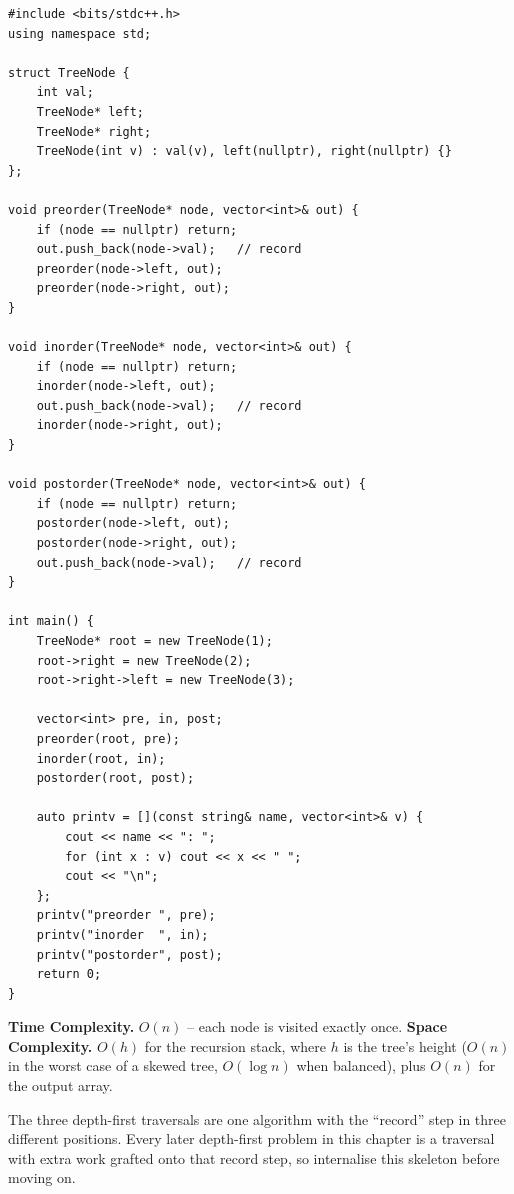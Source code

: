 \begin{lstlisting}
#include <bits/stdc++.h>
using namespace std;

struct TreeNode {
    int val;
    TreeNode* left;
    TreeNode* right;
    TreeNode(int v) : val(v), left(nullptr), right(nullptr) {}
};

void preorder(TreeNode* node, vector<int>& out) {
    if (node == nullptr) return;
    out.push_back(node->val);   // record
    preorder(node->left, out);
    preorder(node->right, out);
}

void inorder(TreeNode* node, vector<int>& out) {
    if (node == nullptr) return;
    inorder(node->left, out);
    out.push_back(node->val);   // record
    inorder(node->right, out);
}

void postorder(TreeNode* node, vector<int>& out) {
    if (node == nullptr) return;
    postorder(node->left, out);
    postorder(node->right, out);
    out.push_back(node->val);   // record
}

int main() {
    TreeNode* root = new TreeNode(1);
    root->right = new TreeNode(2);
    root->right->left = new TreeNode(3);

    vector<int> pre, in, post;
    preorder(root, pre);
    inorder(root, in);
    postorder(root, post);

    auto printv = [](const string& name, vector<int>& v) {
        cout << name << ": ";
        for (int x : v) cout << x << " ";
        cout << "\n";
    };
    printv("preorder ", pre);
    printv("inorder  ", in);
    printv("postorder", post);
    return 0;
}
\end{lstlisting}

\begin{complexitybox}
\textbf{Time Complexity.} $O(n)$ -- each node is visited exactly once.
\textbf{Space Complexity.} $O(h)$ for the recursion stack, where $h$ is
the tree's height ($O(n)$ in the worst case of a skewed tree, $O(\log n)$
when balanced), plus $O(n)$ for the output array.
\end{complexitybox}

\begin{takeawaybox}
The three depth-first traversals are one algorithm with the ``record''
step in three different positions. Every later depth-first problem in this
chapter is a traversal with extra work grafted onto that record step, so
internalise this skeleton before moving on.
\end{takeawaybox}
